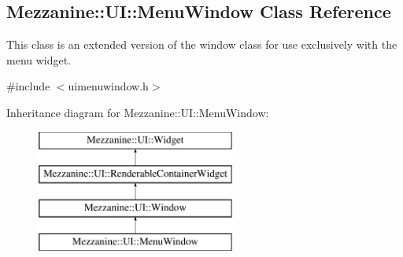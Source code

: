 \hypertarget{classMezzanine_1_1UI_1_1MenuWindow}{
\subsection{Mezzanine::UI::MenuWindow Class Reference}
\label{classMezzanine_1_1UI_1_1MenuWindow}
}


This class is an extended version of the window class for use exclusively with the menu widget.  




{\ttfamily \#include $<$uimenuwindow.h$>$}

Inheritance diagram for Mezzanine::UI::MenuWindow:\begin{figure}[H]
\begin{center}
\leavevmode
\includegraphics[height=4.000000cm]{classMezzanine_1_1UI_1_1MenuWindow}
\end{center}
\end{figure}
